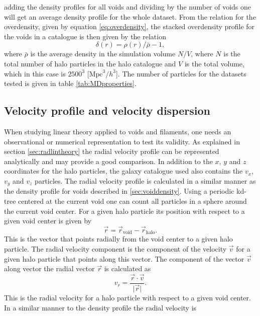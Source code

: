 adding the density profiles for all voids and dividing by the number of voids one
will get an average density profile for the whole dataset. From the relation for the overdensity, given by equation \ref{eq:overdensity},
the stacked overdensity profile for the voids in a catalogue is then given by the relation
\begin{equation}
    \delta(r)=\rho(r)/\bar{\rho}-1,
\end{equation}
where $\bar{\rho}$ is the average density in the simulation volume $N/V$, where $N$ is the total number of halo particles in the halo catalogue
and $V$ is the total volume, which in this case is $2500^3$ [$\mathrm{Mpc}^3/h^3$]. The number of particles for the datasets tested is given in table \ref{tab:MDproperties}. 
\subsection{Velocity profile and velocity dispersion}\label{sec:voidvel}
When studying linear theory applied to voids and filaments, one needs an observational or
numerical representation to test its validity. As explained in section
\ref{sec:radlintheory} the radial velocity profile can be represented analytically and
may provide a good comparison. In addition to the $x$, $y$ and $z$ coordinates for the
halo particles, the galaxy catalogue used also contains the $v_x$, $v_y$ and
$v_z$ particles. The radial velocity profile is calculated in a
similar manner as the density profile for voids described in
\ref{sec:voiddensity}. Using a periodic kd-tree centered at the current void one
can count all particles in a sphere around the current void center. For a given
halo particle its position with respect to a given void center is given by
\begin{equation}\label{eq:voidpos}
    \vec{r}=\vec{r}_{\mathrm{void}}-\vec{r}_{\mathrm{halo}}.
\end{equation}
This is the vector that points radially from the void center to a given halo
particle. The radial velocity component is the component of the velocity $\vec{v}$ for a
given halo particle that points along this vector. The component of the vector
$\vec{v}$ along vector the radial vector $\vec{r}$ is calculated as
\begin{equation}
    v_r=\frac{\vec{r}\cdot\vec{v}}{\vert\vec{r}\vert}.
\end{equation}
This is the radial velocity for a halo particle with respect to a given void
center. In a similar manner to the density profile the radial velocity is
